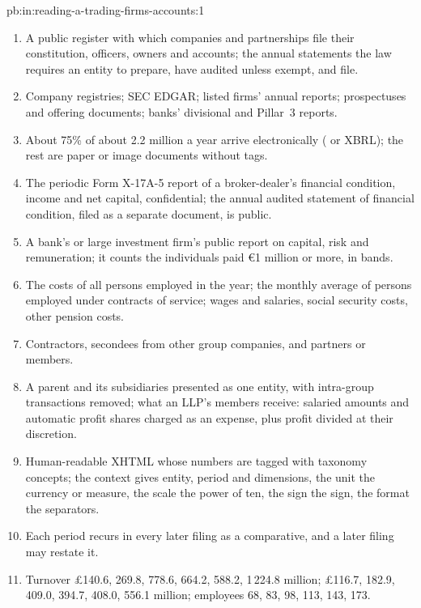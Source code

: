 \begin{solution}{pb:in:reading-a-trading-firms-accounts:1}
\begin{enumerate}
\item A public register with which companies and partnerships file their constitution, officers, owners and accounts;
the annual statements the law requires an entity to prepare, have audited unless exempt, and file.
\item Company registries; SEC EDGAR; listed firms' annual reports; prospectuses and offering documents; banks'
divisional and Pillar~3 reports.
\item About 75\% of about 2.2 million a year arrive electronically ( or XBRL); the rest are paper or image
documents without tags.
\item The periodic Form X-17A-5 report of a broker-dealer's financial condition, income and net capital, confidential;
the annual audited statement of financial condition, filed as a separate document, is public.
\item A bank's or large investment firm's public report on capital, risk and remuneration; it counts the individuals
paid \euro1 million or more, in bands.
\item The costs of all persons employed in the year; the monthly average of persons employed under contracts of
service; wages and salaries, social security costs, other pension costs.
\item Contractors, secondees from other group companies, and partners or members.
\item A parent and its subsidiaries presented as one entity, with intra-group transactions removed; what an LLP's
members receive: salaried amounts and automatic profit shares charged as an expense, plus profit divided at their
discretion.
\item Human-readable XHTML whose numbers are tagged with taxonomy concepts; the context gives entity, period and
dimensions, the unit the currency or measure, the scale the power of ten, the sign the sign, the format the separators.
\item Each period recurs in every later filing as a comparative, and a later filing may restate it.
\item Turnover \pounds140.6, 269.8, 778.6, 664.2, 588.2, 1\,224.8 million;  \pounds116.7, 182.9, 409.0, 394.7,
408.0, 556.1 million; employees 68, 83, 98, 113, 143, 173.

\end{enumerate}
\end{solution}
